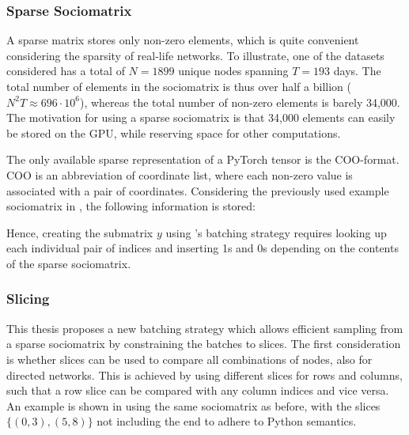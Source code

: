     \subsubsection{Sparse Sociomatrix}
    
        A sparse matrix stores only non-zero elements, which is quite convenient considering the sparsity of real-life networks. To illustrate, one of the datasets considered has a total of $N=1899$ unique nodes spanning $T=193$ days. The total number of elements in the sociomatrix is thus over half a billion ($N^2T \approx 696\cdot 10^6$), whereas the total number of non-zero elements is barely 34,000. The motivation for using a sparse sociomatrix is that 34,000 elements can easily be stored on the GPU, while reserving space for other computations.
        
        The only available sparse representation of a PyTorch tensor is the COO-format. COO is an abbreviation of coordinate list, where each non-zero value is associated with a pair of coordinates. Considering the previously used example sociomatrix in , the following information is stored:
        
        Hence, creating the submatrix $y$ using \citeauthor{jacobsen2018a}'s batching strategy requires looking up each individual pair of indices and inserting 1s and 0s depending on the contents of the sparse sociomatrix.
    
    \subsubsection{Slicing}
    
        This thesis proposes a new batching strategy which allows efficient sampling from a sparse sociomatrix by constraining the batches to slices. The first consideration is whether slices can be used to compare all combinations of nodes, also for directed networks.
        This is achieved by using different slices for rows and columns, such that a row slice can be compared with any column indices and vice versa. An example is shown in  using the same sociomatrix as before, with the slices $\{(0,3), (5,8)\}$ not including the end to adhere to Python semantics.
        
